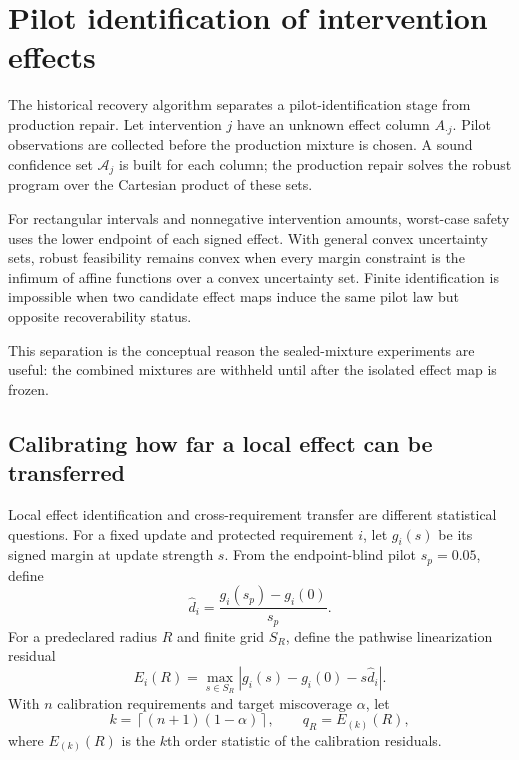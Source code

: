 \documentclass[11pt,letterpaper]{article}
\theoremstyle{plain}
\newcommand{\1}{\mathbf 1}
\begin{document}
\clearpage
\section{Pilot identification of intervention effects}
The historical recovery algorithm separates a pilot-identification stage from production repair. Let intervention $j$ have an unknown effect column $A_{\cdot j}$. Pilot observations are collected before the production mixture is chosen. A sound confidence set $\mathcal A_j$ is built for each column; the production repair solves the robust program over the Cartesian product of these sets.

For rectangular intervals and nonnegative intervention amounts, worst-case safety uses the lower endpoint of each signed effect. With general convex uncertainty sets, robust feasibility remains convex when every margin constraint is the infimum of affine functions over a convex uncertainty set. Finite identification is impossible when two candidate effect maps induce the same pilot law but opposite recoverability status.

This separation is the conceptual reason the sealed-mixture experiments are useful: the combined mixtures are withheld until after the isolated effect map is frozen.

\subsection{Calibrating how far a local effect can be transferred}
Local effect identification and cross-requirement transfer are different statistical questions. For a fixed update and protected requirement $i$, let $g_i(s)$ be its signed margin at update strength $s$. From the endpoint-blind pilot $s_p=0.05$, define
\begin{equation}
 \widehat d_i=\frac{g_i(s_p)-g_i(0)}{s_p}.
\label{eq:r137_pilot_slope}
\end{equation}
For a predeclared radius $R$ and finite grid $S_R$, define the pathwise linearization residual
\begin{equation}
 E_i(R)=\max_{s\in S_R}\left|g_i(s)-g_i(0)-s\widehat d_i\right|.
\label{eq:r137_path_residual}
\end{equation}
With $n$ calibration requirements and target miscoverage $\alpha$, let
\begin{equation}
 k=\left\lceil(n+1)(1-\alpha)\right\rceil,\qquad q_R=E_{(k)}(R),
\label{eq:r137_conformal_q}
\end{equation}
where $E_{(k)}(R)$ is the $k$th order statistic of the calibration residuals.
\end{document}
